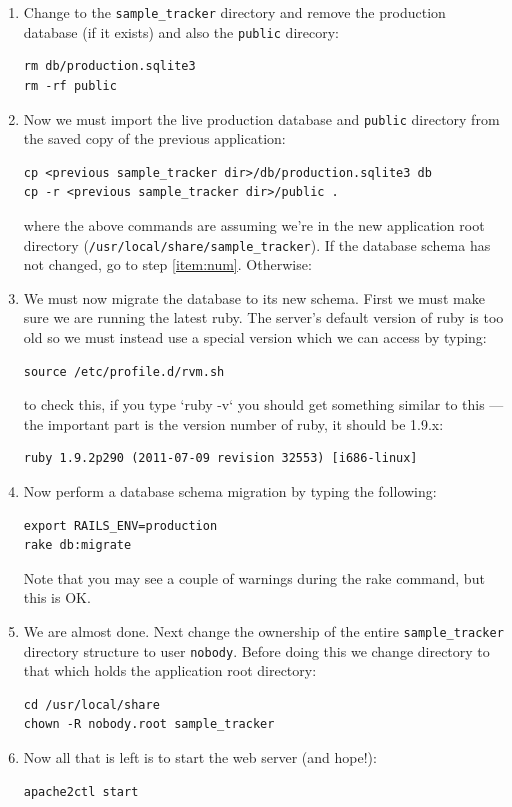 \documentclass[12pt,twoside]{article}
\begin{document}
\begin{enumerate}
\item
Change to the \verb=sample_tracker= directory and remove the production 
database (if it exists) and also the \verb=public= direcory:
\begin{verbatim}
rm db/production.sqlite3
rm -rf public
\end{verbatim}
\item
Now we must import the live production database and \verb=public=
directory from the saved copy of the previous application:
\begin{verbatim}
cp <previous sample_tracker dir>/db/production.sqlite3 db
cp -r <previous sample_tracker dir>/public .
\end{verbatim}
where the above commands are assuming we're in the new application root
directory (\verb=/usr/local/share/sample_tracker=).
If the database schema has not changed, go to step 
\ref{item:num}. Otherwise:
\item
We must now migrate the database to its new schema. First we must make
sure we are running the latest ruby. The server's default version of ruby is
too old so we must instead use a special version which we can access by
typing:
\begin{verbatim}
source /etc/profile.d/rvm.sh
\end{verbatim}
to check this, if you type `ruby -v` you should get something
similar to this --- the important part is the version number of ruby,
it should be 1.9.x:
\begin{verbatim}
ruby 1.9.2p290 (2011-07-09 revision 32553) [i686-linux]
\end{verbatim}
\item
Now perform a database schema migration by typing the following:
\begin{verbatim}
export RAILS_ENV=production
rake db:migrate
\end{verbatim}
Note that you may see a couple of warnings during the rake command, but
this is OK.
\item\label{item:num}
We are almost done. Next change the ownership of the entire 
\verb=sample_tracker=
directory structure to user \verb=nobody=. Before doing this we change
directory to that which holds the application root directory:
\begin{verbatim}
cd /usr/local/share
chown -R nobody.root sample_tracker
\end{verbatim}
\item
Now all that is left is to start the web server (and hope!):
\begin{verbatim}
apache2ctl start
\end{verbatim}

\end{enumerate}
\end{document}
